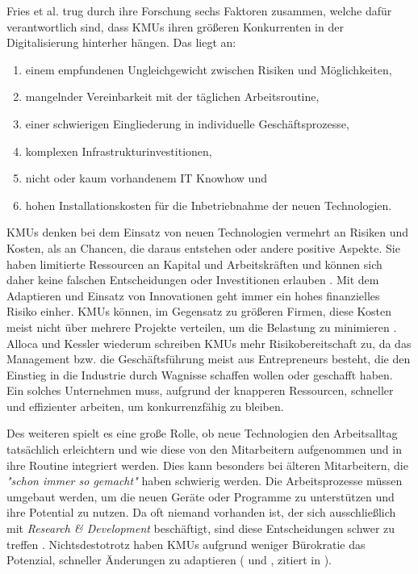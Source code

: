 Fries et al. \cite{hateful_six_krcmar} trug durch ihre Forschung sechs Faktoren zusammen, welche dafür verantwortlich sind, dass KMUs ihren größeren Konkurrenten in der Digitalisierung hinterher hängen. Das liegt an: 

\begin{enumerate}
	\item einem empfundenen Ungleichgewicht zwischen Risiken und Möglichkeiten,
	\item mangelnder Vereinbarkeit mit der täglichen Arbeitsroutine,
	\item einer schwierigen Eingliederung in individuelle Geschäftsprozesse,
	\item komplexen Infrastrukturinvestitionen,
	\item nicht oder kaum vorhandenem IT Knowhow und
	\item hohen Installationskosten für die Inbetriebnahme der neuen Technologien.
\end{enumerate}

KMUs denken bei dem Einsatz von neuen Technologien vermehrt an Risiken und Kosten, als an Chancen, die daraus entstehen oder andere positive Aspekte. Sie haben limitierte Ressourcen an Kapital und Arbeitskräften und können sich daher keine falschen Entscheidungen oder Investitionen erlauben \cite{allocca_innovation_2006}. Mit dem Adaptieren und Einsatz von Innovationen geht immer ein hohes finanzielles Risiko einher. KMUs können, im Gegensatz zu größeren Firmen, diese Kosten meist nicht über mehrere Projekte verteilen, um die Belastung zu minimieren \cite{rothwell_small_1989}. \\
Alloca und Kessler \cite{allocca_innovation_2006} wiederum schreiben KMUs mehr Risikobereitschaft zu, da das Management bzw. die Geschäftsführung meist aus Entrepreneurs besteht, die den Einstieg in die Industrie durch Wagnisse schaffen wollen oder geschafft haben. Ein solches Unternehmen muss, aufgrund der knapperen Ressourcen, schneller und effizienter arbeiten, um konkurrenzfähig zu bleiben.

Des weiteren spielt es eine große Rolle, ob neue Technologien den Arbeitsalltag tatsächlich erleichtern und wie diese von den Mitarbeitern aufgenommen und in ihre Routine integriert werden. Dies kann besonders bei älteren Mitarbeitern, die \textit{"schon immer so gemacht"} haben schwierig werden. Die Arbeitsprozesse müssen umgebaut werden, um die neuen Geräte oder Programme zu unterstützen und ihre Potential zu nutzen. Da oft niemand vorhanden ist, der sich ausschließlich mit \textit{Research \& Development} beschäftigt, sind diese Entscheidungen schwer zu treffen \cite{rothwell_small_1989}. Nichtsdestotrotz haben KMUs aufgrund weniger Bürokratie das Potenzial, schneller Änderungen zu adaptieren (\cite{kessler_innovation_1996} und \cite{kessler_speeding_1999}, zitiert in \cite{allocca_innovation_2006}).

